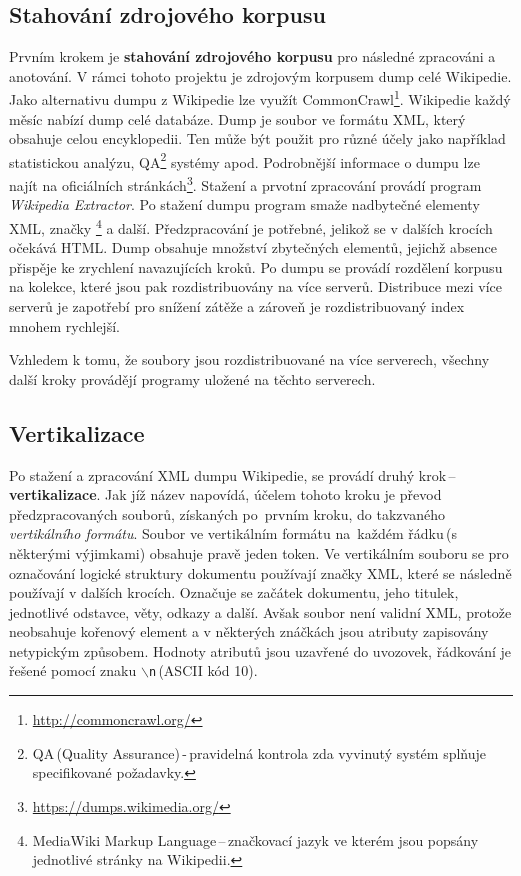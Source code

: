 \subsection*{Stahování zdrojového korpusu}
Prvním krokem je \textbf{stahování zdrojového  korpusu} pro následné zpracováni a anotování. V rámci tohoto projektu je zdrojovým korpusem dump celé Wikipedie. Jako alternativu dumpu z Wikipedie lze využít CommonCrawl\footnote{\href{http://commoncrawl.org/}{http://commoncrawl.org/}}. Wikipedie každý měsíc nabízí dump celé databáze. Dump je soubor ve formátu XML, který obsahuje celou encyklopedii. Ten může být použit pro různé účely jako například statistickou analýzu, QA\footnote{QA\,(Quality Assurance)\,-\,pravidelná kontrola zda vyvinutý systém splňuje specifikované požadavky.} systémy apod. Podrobnější informace o dumpu lze najít na oficiálních stránkách\footnote{\href{https://dumps.wikimedia.org/}{https://dumps.wikimedia.org/}}. Stažení a prvotní zpracování provádí program \emph{Wikipedia Extractor}. Po stažení dumpu program smaže nadbytečné elementy XML, značky \footnote{MediaWiki Markup Language\,--\,značkovací jazyk ve kterém jsou popsány jednotlivé stránky na Wikipedii.} a další. Předzpracování je potřebné, jelikož se v dalších krocích očekává  HTML. Dump obsahuje množství zbytečných elementů, jejichž absence přispěje ke zrychlení navazujících kroků. Po  dumpu  se provádí rozdělení korpusu na kolekce, které jsou pak rozdistribuovány na více serverů. Distribuce mezi více serverů je zapotřebí pro snížení zátěže a zároveň je rozdistribuovaný index mnohem rychlejší. 


Vzhledem k tomu, že soubory jsou rozdistribuované na více serverech, všechny další kroky provádějí programy uložené na těchto serverech.

\subsection*{Vertikalizace}
\label{VerticalLbl}
Po stažení a zpracování XML dumpu Wikipedie, se provádí druhý krok\,--\,\textbf{vertikalizace}. Jak jíž název napovídá, účelem tohoto kroku je převod předzpracovaných souborů, získaných po~prvním kroku, do takzvaného \emph{vertikálního formátu}. Soubor ve vertikálním formátu na~každém řádku\,(s některými výjimkami) obsahuje pravě jeden token. Ve vertikálním souboru se pro označování logické struktury dokumentu používají značky XML, které se následně používají v dalších krocích. Označuje se začátek dokumentu, jeho titulek, jednotlivé odstavce, věty, odkazy a další. Avšak soubor není validní XML, protože neobsahuje kořenový element a v některých znáčkách jsou atributy zapisovány netypickým způsobem. Hodnoty atributů jsou uzavřené do uvozovek, řádkování je řešené pomocí znaku \texttt{$\backslash$n}\,(ASCII kód 10).

